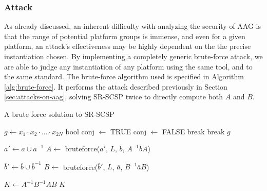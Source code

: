 \subsubsection{Attack} As already discussed, an inherent difficulty with analyzing the security of AAG is that the range of potential platform groups is immense, and even for a given platform, an attack's effectiveness may be highly dependent on the the precise instantiation chosen. By implementing a completely generic brute-force attack, we are able to judge any instantiation of any platform using the same tool, and to the same standard. The brute-force algorithm used is specified in Algorithm \ref{alg:brute-force}. It performs the attack described previously in Section \ref{sec:attacks-on-aag}, solving SR-SCSP twice to directly compute both $A$ and $B$.


\begin{algorithm}
\caption{A brute force solution to SR-SCSP}\label{alg:brute-force}
\DontPrintSemicolon
{}
{
    {
        $g \gets x_1 \cdot x_2 \cdot ... \cdot x_{2N}$\;
        bool conj $\gets$ TRUE\;
        {
            {
                conj $\gets$ FALSE\;
                break\;
            }
        }
        {
            break\;
        }
    }
    \KwRet $g$\;
}
\;
{
    $\overline{a}' \gets \overline{a} \cup \overline{a}^{-1}$\;
    $A \gets$ bruteforce($\overline{a}'$, $L$, $\overline{b}$, $A^{-1}\overline{b}A$)\;

    $\overline{b}' \gets \overline{b} \cup \overline{b}^{-1}$\;
    $B \gets$ bruteforce($\overline{b}'$, $L$, $\overline{a}$, $B^{-1}\overline{a}B$)\;
    
    $K \gets A^{-1}B^{-1}AB$\;
    \KwRet $K$\;
}
\end{algorithm}

